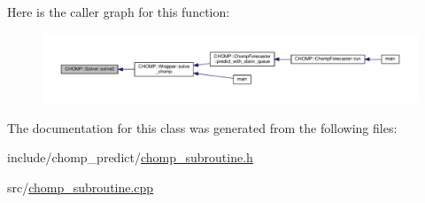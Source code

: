 Here is the caller graph for this function\+:
\nopagebreak
\begin{figure}[H]
\begin{center}
\leavevmode
\includegraphics[width=350pt]{class_c_h_o_m_p_1_1_solver_a43e2f6c0f831b988ae6c578117343e5d_icgraph}
\end{center}
\end{figure}




The documentation for this class was generated from the following files\+:\begin{DoxyCompactItemize}
\item 
include/chomp\+\_\+predict/\hyperlink{chomp__subroutine_8h}{chomp\+\_\+subroutine.\+h}\item 
src/\hyperlink{chomp__subroutine_8cpp}{chomp\+\_\+subroutine.\+cpp}\end{DoxyCompactItemize}
